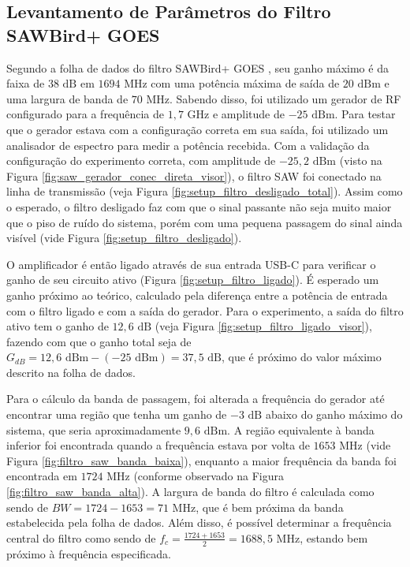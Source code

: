 \begin{apendicesenv}
\chapter{Levantamento de Parâmetros do Filtro SAWBird+ GOES}\label{cap:apendice_filtro_saw}
Segundo a folha de dados do filtro SAWBird+ GOES \cite{nooelec_sawbird_goes}, seu ganho máximo é da faixa de $38 \text{ dB}$ em $1694 \text{ MHz}$ com uma potência máxima de saída de $20 \text{ dBm}$ e uma largura de banda de $70 \text{ MHz}$.
Sabendo disso, foi utilizado um gerador de RF configurado para a frequência de $1,7 \text{ GHz}$ e amplitude de $-25 \text{ dBm}$. Para testar que o gerador estava com a configuração correta em sua saída, foi utilizado um analisador de espectro para medir a potência recebida.
Com a validação da configuração do experimento correta, com amplitude de $-25,2 \text{ dBm}$ (visto na Figura {\ref{fig:saw_gerador_conec_direta_visor}}), o filtro SAW foi conectado na linha de transmissão (veja Figura \ref{fig:setup_filtro_desligado_total}).
Assim como o esperado, o filtro desligado faz com que o sinal passante não seja muito maior que o piso de ruído do sistema, porém com uma pequena passagem do sinal ainda visível (vide Figura \ref{fig:setup_filtro_desligado}).

O amplificador é então ligado através de sua entrada USB-C para verificar o ganho de seu circuito ativo (Figura \ref{fig:setup_filtro_ligado}).
É esperado um ganho próximo ao teórico, calculado pela diferença entre a potência de entrada com o filtro ligado e com a saída do gerador.
Para o experimento, a saída do filtro ativo tem o ganho de $12,6 \text{ dB}$ (veja Figura \ref{fig:setup_filtro_ligado_visor}), fazendo com que o ganho total seja de $G_{dB} = 12,6\text{ dBm} - (-25\text{ dBm}) = 37,5 \text{ dB}$, que é próximo do valor máximo descrito na folha de dados.

Para o cálculo da banda de passagem, foi alterada a frequência do gerador até encontrar uma região que tenha um ganho de $-3 \text{ dB}$ abaixo do ganho máximo do sistema, que seria aproximadamente $9,6 \text{ dBm}$.
A região equivalente à banda inferior foi encontrada quando a frequência estava por volta de $1653 \text{ MHz}$ (vide Figura \ref{fig:filtro_saw_banda_baixa}), enquanto a maior frequência da banda foi encontrada em $1724 \text{ MHz}$ (conforme observado na Figura \ref{fig:filtro_saw_banda_alta}).
A largura de banda do filtro é calculada como sendo de $BW = 1724 - 1653 = 71 \text{ MHz}$, que é bem próxima da banda estabelecida pela folha de dados. Além disso, é possível determinar a frequência central do filtro como sendo de $f_{c} = \frac{1724+1653}{2} = 1688,5 \text{ MHz}$, estando bem próximo à frequência especificada.


\end{apendicesenv}

